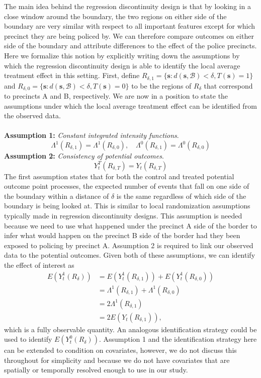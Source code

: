 \documentclass[a4paper,11pt]{article}
\begin{document}
The main idea behind the regression discontinuity design is that by looking in a close window around the boundary, the two regions on either side of the boundary are very similar with respect to all important features except for which precinct they are being policed by. We can therefore compare outcomes on either side of the boundary and attribute differences to the effect of the police precincts. Here we formalize this notion by explicitly writing down the assumptions by which the regression discontinuity design is able to identify the local average treatment effect in this setting. First, define $R_{\delta, 1} = \{ \boldsymbol{s}:d(\boldsymbol{s}, \mathcal{B}) < \delta, T(\boldsymbol{s}) = 1 \}$ and $R_{\delta, 0} = \{ \boldsymbol{s}:d(\boldsymbol{s}, \mathcal{B}) < \delta, T(\boldsymbol{s}) = 0 \}$ to be the regions of $R_{\delta}$ that correspond to precincts A and B, respectively. We are now in a position to state the assumptions under which the local average treatment effect can be identified from the observed data. \\
\\
\textbf{Assumption 1:} \textit{Constant integrated intensity functions}. $$\Lambda^1(R_{\delta, 1}) = \Lambda^1(R_{\delta, 0}), \quad \Lambda^0(R_{\delta, 1}) = \Lambda^0(R_{\delta, 0})$$
\textbf{Assumption 2:} \textit{Consistency of potential outcomes}. $$Y_t^T(R_{\delta, T}) = Y_t(R_{\delta, T})$$
The first assumption states that for both the control and treated potential outcome point processes, the expected number of events that fall on one side of the boundary within a distance of $\delta$ is the same regardless of which side of the boundary is being looked at. This is similar to local randomization assumptions typically made in regression discontinuity designs. This assumption is needed because we need to use what happened under the precinct A side of the border to infer what would happen on the precinct B side of the border had they been exposed to policing by precinct A. Assumption 2 is required to link our observed data to the potential outcomes. Given both of these assumptions, we can identify the effect of interest as
\begin{align*}
    E(Y_t^1(R_{\delta})) &= E(Y_t^1(R_{\delta, 1})) + E(Y_t^1(R_{\delta, 0})) \\
    &= \Lambda^1(R_{\delta, 1}) + \Lambda^1(R_{\delta, 0}) \\
    &= 2 \Lambda^1(R_{\delta, 1}) \\
    &= 2 E(Y_t(R_{\delta, 1})),
\end{align*}
which is a fully observable quantity. An analogous identification strategy could be used to identify $E(Y_t^0(R_{\delta}))$. Assumption 1 and the identification strategy here can be extended to condition on covariates, however, we do not discuss this throughout for simplicity and because we do not have covariates that are spatially or temporally resolved enough to use in our study. 
\end{document}

